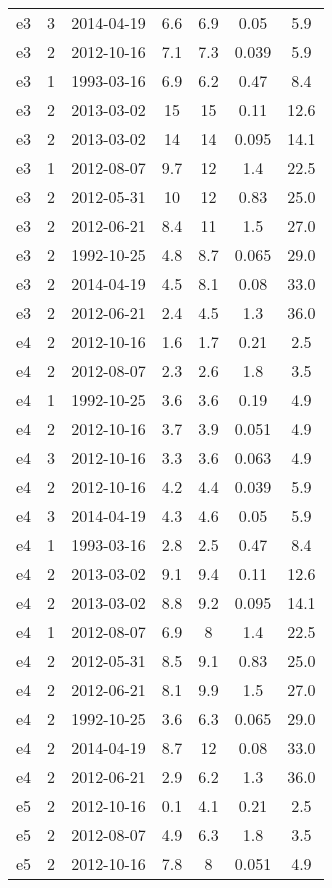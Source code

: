 \begin{table*}[htp]
\begin{tabular}{ccccccc}
e3 & 3 & 2014-04-19 & 6.6 & 6.9 & 0.05 & 5.9 \\
e3 & 2 & 2012-10-16 & 7.1 & 7.3 & 0.039 & 5.9 \\
e3 & 1 & 1993-03-16 & 6.9 & 6.2 & 0.47 & 8.4 \\
e3 & 2 & 2013-03-02 & 15 & 15 & 0.11 & 12.6 \\
e3 & 2 & 2013-03-02 & 14 & 14 & 0.095 & 14.1 \\
e3 & 1 & 2012-08-07 & 9.7 & 12 & 1.4 & 22.5 \\
e3 & 2 & 2012-05-31 & 10 & 12 & 0.83 & 25.0 \\
e3 & 2 & 2012-06-21 & 8.4 & 11 & 1.5 & 27.0 \\
e3 & 2 & 1992-10-25 & 4.8 & 8.7 & 0.065 & 29.0 \\
e3 & 2 & 2014-04-19 & 4.5 & 8.1 & 0.08 & 33.0 \\
e3 & 2 & 2012-06-21 & 2.4 & 4.5 & 1.3 & 36.0 \\
e4 & 2 & 2012-10-16 & 1.6 & 1.7 & 0.21 & 2.5 \\
e4 & 2 & 2012-08-07 & 2.3 & 2.6 & 1.8 & 3.5 \\
e4 & 1 & 1992-10-25 & 3.6 & 3.6 & 0.19 & 4.9 \\
e4 & 2 & 2012-10-16 & 3.7 & 3.9 & 0.051 & 4.9 \\
e4 & 3 & 2012-10-16 & 3.3 & 3.6 & 0.063 & 4.9 \\
e4 & 2 & 2012-10-16 & 4.2 & 4.4 & 0.039 & 5.9 \\
e4 & 3 & 2014-04-19 & 4.3 & 4.6 & 0.05 & 5.9 \\
e4 & 1 & 1993-03-16 & 2.8 & 2.5 & 0.47 & 8.4 \\
e4 & 2 & 2013-03-02 & 9.1 & 9.4 & 0.11 & 12.6 \\
e4 & 2 & 2013-03-02 & 8.8 & 9.2 & 0.095 & 14.1 \\
e4 & 1 & 2012-08-07 & 6.9 & 8 & 1.4 & 22.5 \\
e4 & 2 & 2012-05-31 & 8.5 & 9.1 & 0.83 & 25.0 \\
e4 & 2 & 2012-06-21 & 8.1 & 9.9 & 1.5 & 27.0 \\
e4 & 2 & 1992-10-25 & 3.6 & 6.3 & 0.065 & 29.0 \\
e4 & 2 & 2014-04-19 & 8.7 & 12 & 0.08 & 33.0 \\
e4 & 2 & 2012-06-21 & 2.9 & 6.2 & 1.3 & 36.0 \\
e5 & 2 & 2012-10-16 & 0.1 & 4.1 & 0.21 & 2.5 \\
e5 & 2 & 2012-08-07 & 4.9 & 6.3 & 1.8 & 3.5 \\
e5 & 2 & 2012-10-16 & 7.8 & 8 & 0.051 & 4.9 \\

\end{tabular}
\end{table*}
